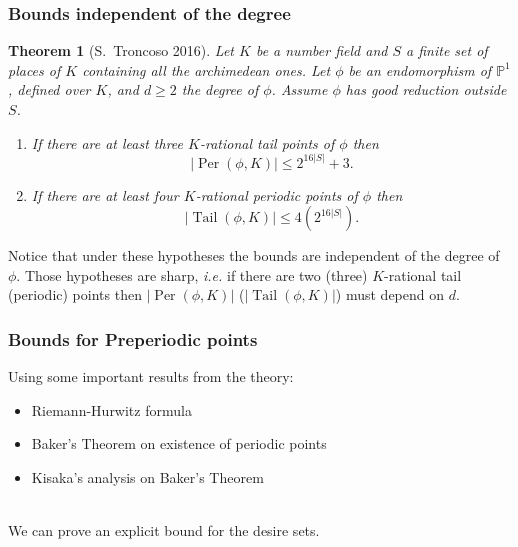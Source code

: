 \documentclass{beamer}
\def\jump{ \quad \\ \vspace{0.7cm} \pause}
\def\PP{{\mathbb P}}
\DeclareMathOperator{\Tail}{Tail}
\DeclareMathOperator{\Per}{Per}
\theoremstyle{thmstyle}
\theoremstyle{thmstyle}
\newtheorem*{mythm}{Theorem}
\theoremstyle{mystyle}
\theoremstyle{qstnstyle}
\begin{document}
\begin{frame}
\frametitle{Bounds independent of the degree}
\begin{mythm}[S.\ Troncoso 2016]
Let $K$ be a number field and $S$ a finite set of places of $K$ containing all the archimedean ones. Let $\phi $ be an endomorphism of $\PP^1$, defined over $K$, and $d \geq 2$ the degree of $\phi$. Assume $\phi$ has  good reduction outside $S$.
\begin{enumerate}

\item [(a)] 
If there are at least three $K$-rational tail points of $\phi$ then
$$|\Per(\phi,K)| \leq 2^{16|S|}+3. $$

\item [(b)]
If there are at least four $K$-rational periodic points of $\phi$ then
$$|\Tail(\phi,K)| \leq 4(2^{16|S|}).$$
\end{enumerate}
\end{mythm}
\pause
Notice that under these hypotheses the bounds are independent of the degree of $\phi$. Those hypotheses are sharp, \emph{i.e.} if there are two (three) $K$-rational tail (periodic) points then $|\Per(\phi,K)|$ ($|\Tail(\phi,K)|$) must depend on $d$. 
\end{frame}

\begin{frame}
\frametitle{Bounds for Preperiodic points}

Using  some important results from the theory:\pause
\begin{itemize}
\item Riemann-Hurwitz formula
\jump
\item  Baker's Theorem on existence of periodic points
\jump
\item Kisaka's analysis on Baker's Theorem
\end{itemize}
\jump We can prove an explicit bound for the desire sets.

\end{frame}
\end{document}
